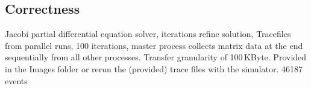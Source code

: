 \documentclass[
     11pt,         %
     a4paper,      %
     BCOR10mm,     %
     DIV14,        %
     liststotoc,   %
     bibtotoc,     %
     idxtotoc,     %
     parskip       %
     ]{scrreprt}   %
\begin{document}
\subsection{Correctness}
Jacobi partial differential equation solver, iterations refine solution, Tracefiles from parallel runs, 100 iterations, master process collects matrix data at the end sequentially from all other processes.
Transfer granularity of 100\,KByte. Provided in the Images folder or rerun the (provided) trace files with the simulator. 
46187 events


\begin{figure}[!htbp]
  \centering
\end{figure}
\end{document}
